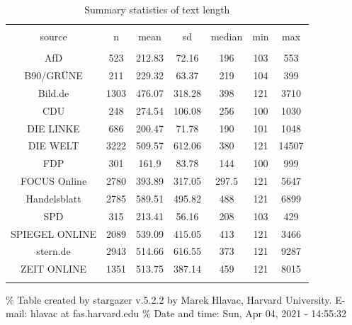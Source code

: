 \documentclass[
]{article}
\begin{document}
\begin{table}[!htbp] \centering 
  \caption{Summary statistics of text length} 
  \label{table:text_length} 
\begin{tabular}{@{\extracolsep{5pt}} ccccccc} 
\\[-1.8ex]\hline 
\hline \\[-1.8ex] 
source & n & mean & sd & median & min & max \\ 
\hline \\[-1.8ex] 
AfD & 523 & 212.83 & 72.16 & 196 & 103 & 553 \\ 
B90/GRÜNE & 211 & 229.32 & 63.37 & 219 & 104 & 399 \\ 
Bild.de & 1303 & 476.07 & 318.28 & 398 & 121 & 3710 \\ 
CDU & 248 & 274.54 & 106.08 & 256 & 100 & 1030 \\ 
DIE LINKE & 686 & 200.47 & 71.78 & 190 & 101 & 1048 \\ 
DIE WELT & 3222 & 509.57 & 612.06 & 380 & 121 & 14507 \\ 
FDP & 301 & 161.9 & 83.78 & 144 & 100 & 999 \\ 
FOCUS Online & 2780 & 393.89 & 317.05 & 297.5 & 121 & 5647 \\ 
Handelsblatt & 2785 & 589.51 & 495.82 & 488 & 121 & 6899 \\ 
SPD & 315 & 213.41 & 56.16 & 208 & 103 & 429 \\ 
SPIEGEL ONLINE & 2089 & 539.09 & 415.05 & 413 & 121 & 3466 \\ 
stern.de & 2943 & 514.66 & 616.55 & 373 & 121 & 9287 \\ 
ZEIT ONLINE & 1351 & 513.75 & 387.14 & 459 & 121 & 8015 \\ 
\hline \\[-1.8ex] 
\end{tabular} 
\end{table}

\% Table created by stargazer v.5.2.2 by Marek Hlavac, Harvard
University. E-mail: hlavac at fas.harvard.edu \% Date and time: Sun, Apr
04, 2021 - 14:55:32
\end{document}
